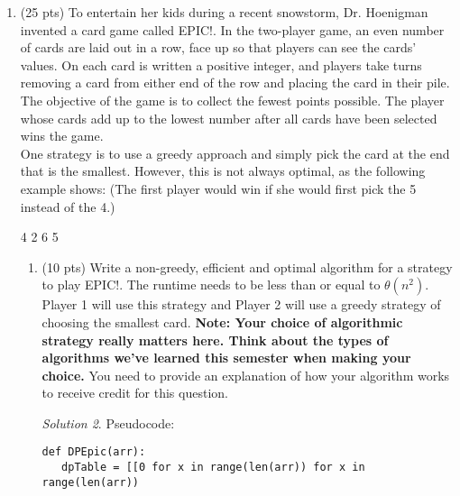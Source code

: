 \documentclass[12pt]{article}
\theoremstyle{remark}
\newtheorem*{solution}{Solution}
\begin{document}
\begin{enumerate}
\begin{enumerate}
\begin{solution}
\begin{verbatim}
   EC = 0
   for  i from 0 to k:
      for j equal to every node:
         if value of node + edge > j:
            m[i + 1][j] = value of node to edge
   
   if HUMN = INF:
      return "Not possible to reach distination"
   else:
      path = []
      backtrack from humanities storing each stop in path
      return path
            
\end{verbatim}
    \end{solution}
    \pagebreak

    \item (10 pts) Implement your algorithm using the starter code provided on Canvas. 
    
\end{enumerate}

\item (25 pts) To entertain her kids during a recent snowstorm, Dr. Hoenigman invented a card game called EPIC!. In the two-player game, an even number of cards are laid out in a row, face up so that players can see the cards' values. On each card is written a positive integer, and players take turns removing a card from either end of the row and placing the card in their pile. The objective of the game is to collect the fewest points possible. The player whose cards add up to the lowest number after all cards have been selected wins the game.
\\One strategy is to use a greedy approach and simply pick the card at the end that is the smallest. However, this is not always optimal, as the following example shows: (The first player would win if she would first pick the 5 instead of the 4.)

4 2 6 5

\begin{enumerate}
\item (10 pts) Write a non-greedy, efficient and optimal algorithm for a strategy to play EPIC!. The runtime needs to be less than or equal to $\theta(n^2)$. Player 1 will use this strategy and Player 2 will use a greedy strategy of choosing the smallest card. \textbf{Note: Your choice of algorithmic strategy really matters here. Think about the types of algorithms we've learned this semester when making your choice.} You need to provide an explanation of how your algorithm works to receive credit for this question.
    \begin{solution}Pseudocode: 
\begin{verbatim}
def DPEpic(arr):
   dpTable = [[0 for x in range(len(arr)) for x in range(len(arr))
   

\end{verbatim}
\end{solution}
\end{enumerate}
\end{enumerate}
\end{document}
